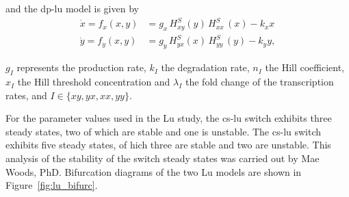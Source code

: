 and the \acrshort{dp-lu} model is given by
\begin{align}
\dot{x} = f_{x}(x,y) &= g_{x}\, H^{S}_{xy}(y)\, H^{S}_{xx}\,(x)-k_{x}x \\
\dot{y} = f_{y}(x,y) &= g_{y}\,H^{S}_{yx}(x)\,H^{S}_{yy}\,(y)-k_{y}y,
\end{align}

\noindent $g_I$ represents the production rate, $k_I$ the degradation rate, $n_I$ the Hill coefficient, $x_I$ the Hill threshold concentration and $\lambda_I$ the fold change of the transcription rates, and $I\in\{xy, yx, xx, yy\}$.

For the parameter values used in the Lu study, the \acrshort{cs-lu} switch exhibits three steady states, two of which are stable and one is unstable. The \acrshort{cs-lu} switch exhibits five steady states, of hich three are stable and two are unstable. This analysis of the stability of the switch steady states was carried out by Mae Woods, PhD. Bifurcation diagrams of the two Lu models are shown in Figure~\ref{fig:lu_bifurc}. 


